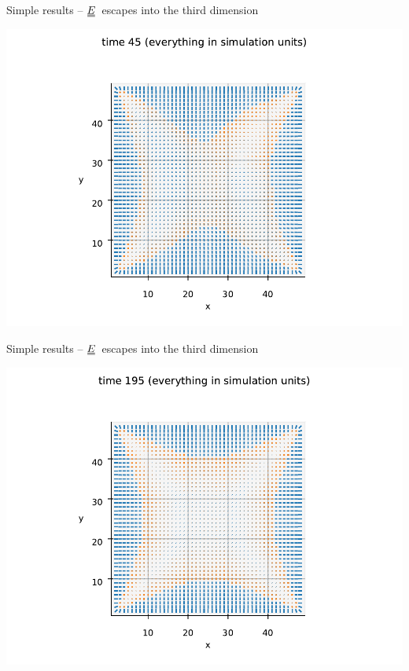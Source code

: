 \documentclass[10pt,mathserif]{beamer}
\newcommand{\duf}[2]{\stackunder[0.5pt]{\stackunder[0.8pt]{\stackunder[1pt]{\ensuremath{#1}}{\rule{\widthof{\ensuremath{#2}}*\real{0.9}}{.1ex}}}{\rule{\widthof{\ensuremath{#2}}*\real{0.9}}{.1ex}}}{}}
\newcommand{\du}[1]{\duf{#1}{#1}}
\newcommand{\EE}{\ensuremath{\du{E}}}
\begin{document}
\begin{frame}[fragile]{Simple results -- \EE\ escapes into the third dimension}
    \newrefsection
    \begin{center}
        \includegraphics[width=\textwidth]{figures/prelim3.pdf}
    \end{center}
\end{frame}

\begin{frame}[fragile]{Simple results -- \EE\ escapes into the third dimension}
    \newrefsection
    \begin{center}
        \includegraphics[width=\textwidth]{figures/prelim4.pdf}
    \end{center}
\end{frame}
\end{document}
